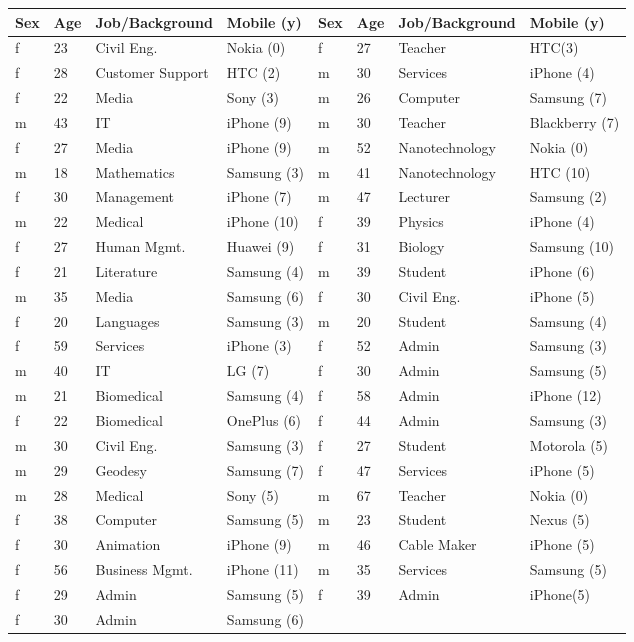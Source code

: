 \documentclass[10pt,twocolumn]{article}
\begin{document}
\begin{table*}[t]
\centering
\begin{tabular}{|l|l|l|l||l|l|l|l|}
\hline
Sex & Age & Job/Background& Mobile (y)& Sex & Age & Job/Background& Mobile (y)\\
\hline
f& 23& Civil Eng.& Nokia (0)&
f& 27& Teacher& HTC(3)\\
f& 28& Customer Support& HTC (2)& 
m& 30& Services& iPhone (4)\\
f& 22& Media & Sony (3)& 
m& 26& Computer & Samsung (7)\\
m& 43& IT& iPhone (9)& 
m& 30& Teacher& Blackberry (7)\\
f& 27& Media & iPhone (9)& 
m& 52& Nanotechnology& Nokia (0)\\
m& 18& Mathematics& Samsung (3)& 
m& 41& Nanotechnology& HTC (10)\\
f& 30& Management& iPhone (7)& 
m& 47& Lecturer& Samsung (2)\\
m& 22& Medical& iPhone (10)& 
f& 39& Physics& iPhone (4)\\
f& 27& Human Mgmt.& Huawei (9)& 
f& 31& Biology & Samsung (10)\\
f& 21& Literature& Samsung (4)& 
m& 39& Student& iPhone (6)\\
m& 35& Media & Samsung (6)& 
f& 30& Civil Eng.& iPhone (5)\\
f& 20& Languages& Samsung (3)& 
m& 20& Student& Samsung (4)\\
f& 59& Services& iPhone (3)& 
f& 52& Admin& Samsung (3)\\
m& 40& IT& LG (7)& 
f& 30& Admin& Samsung (5)\\
m& 21& Biomedical& Samsung (4)&
f& 58& Admin &iPhone (12)\\
f& 22& Biomedical& OnePlus (6)&
f& 44& Admin& Samsung (3)\\
m& 30& Civil Eng.& Samsung (3)&
f& 27& Student& Motorola (5)\\
m& 29& Geodesy& Samsung (7)&
f& 47& Services& iPhone (5)\\
m& 28& Medical& Sony (5)&
m& 67& Teacher& Nokia (0)\\
f& 38& Computer& Samsung (5)&
m& 23& Student& Nexus (5)\\
f& 30& Animation& iPhone (9)&
m& 46& Cable Maker& iPhone (5)\\
f& 56& Business Mgmt.& iPhone (11)&
m& 35& Services& Samsung (5)\\
f& 29& Admin& Samsung (5)&
f& 39& Admin& iPhone(5)\\
f& 30& Admin& Samsung (6)&

\end{tabular}
\end{table*}
\end{document}
